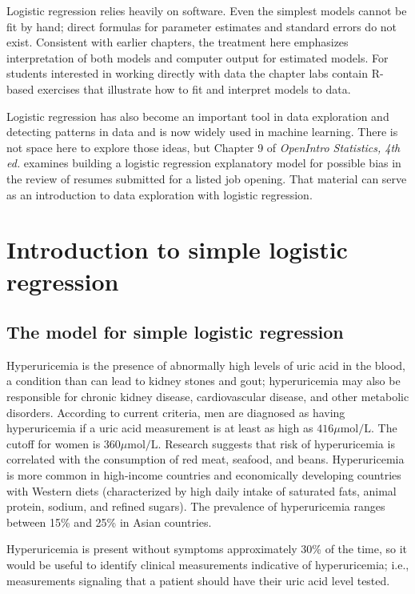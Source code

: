 Logistic regression relies heavily on software.  Even the simplest models cannot be fit by hand; direct formulas for parameter estimates and standard errors do not exist.  Consistent with earlier chapters, the treatment here emphasizes interpretation of both models and computer output for estimated models.  For students interested in working directly with data the chapter labs contain \textsf{R}-based exercises that illustrate how to fit and interpret models to data.

Logistic regression has also become an important tool in data exploration and detecting patterns in data and is now widely used in machine learning.  There is not space here to explore those ideas, but Chapter 9 of \textit{OpenIntro Statistics, 4th ed.} examines building a logistic regression explanatory model for possible bias in the review of resumes submitted for a listed job opening.  That material can serve as an introduction to data exploration with logistic regression.

\section{Introduction to simple logistic regression}
\label{introSimpleLogisticRegression}

\subsection{The model for simple logistic regression}


Hyperuricemia is the presence of abnormally high levels of uric acid in the blood, a  condition than can lead to kidney stones and gout; hyperuricemia may also be responsible for chronic kidney disease, cardiovascular disease, and other metabolic disorders. According to current criteria, men are diagnosed as having hyperuricemia if a uric acid measurement is at least as high as $416\mu\text{mol/L}$.  The cutoff for women is $360\mu\text{mol/L}$. Research suggests that risk of hyperuricemia is correlated with the consumption of red meat, seafood, and beans. Hyperuricemia is more common in high-income countries and economically developing countries with Western diets (characterized by high daily intake of saturated fats, animal protein, sodium, and refined sugars). The prevalence of hyperuricemia ranges between 15\% and 25\% in Asian countries. 

Hyperuricemia is present without symptoms approximately 30\% of the time, so it would be useful to identify clinical measurements indicative of hyperuricemia; i.e., measurements signaling that a patient should have their uric acid level tested.

